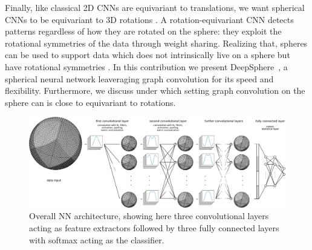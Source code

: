 \documentclass{article} %
\newcommand{\1}{\b{1}}              %
\newcommand{\0}{\b{0}}              %
\newcommand{\todo}[1]{{\color[rgb]{.6,.1,.6}{#1}}}
\begin{document}
Finally, like classical 2D CNNs are equivariant to translations, we want spherical CNNs to be equivariant to 3D rotations \citep{cohen2016equivariance, kondor2018equivariance}.
A rotation-equivariant CNN detects patterns regardless of how they are rotated on the sphere: they exploit the rotational symmetries of the data through weight sharing.
Realizing that, spheres can be used to support data which does not intrinsically live on a sphere but have rotational symmetries \citep[for 3D objects and molecules]{cohen2018sphericalcnn, esteves2017sphericalcnn}.
In this contribution we present DeepSphere~\cite{perraudin2018deepsphere}, a spherical neural network leaveraging graph convolution for its speed and flexibility. Furthermore, we discuss under which setting graph convolution on the sphere can is close to equivariant to rotations.



\begin{figure}[t!]
	\centering
	\includegraphics[width=0.9\linewidth]{figure_architecture_v3}
	\caption{Overall NN architecture, showing here three convolutional layers acting as feature extractors followed by three fully connected layers with softmax acting as the classifier.
	}
	\label{fig:architecture}
\end{figure}
\end{document}
